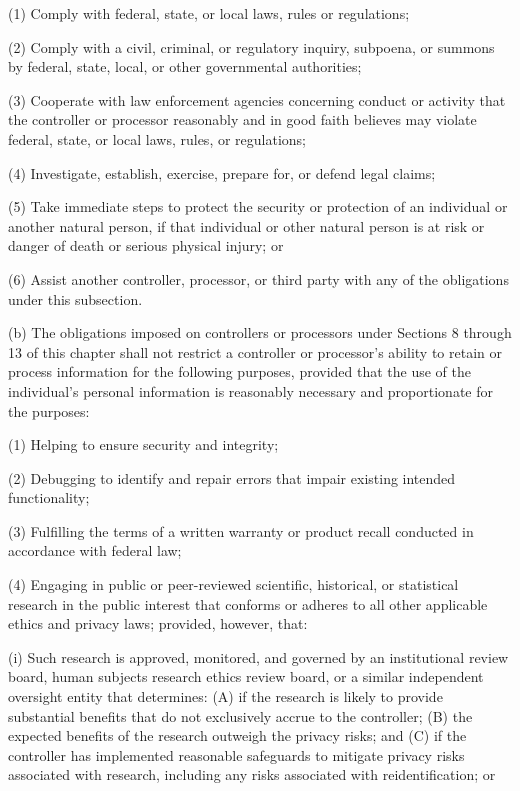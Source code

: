(1) Comply with federal, state, or local laws, rules or regulations;

(2) Comply with a civil, criminal, or regulatory inquiry, subpoena, or summons by federal, state, local, or other governmental authorities;

(3) Cooperate with law enforcement agencies concerning conduct or activity that the controller or processor reasonably and in good faith believes may violate federal, state, or local laws, rules, or regulations;

(4) Investigate, establish, exercise, prepare for, or defend legal claims;

(5) Take immediate steps to protect the security or protection of an individual or another natural person, if that individual or other natural person is at risk or danger of death or serious physical injury; or

(6) Assist another controller, processor, or third party with any of the obligations under this subsection.

(b) The obligations imposed on controllers or processors under Sections 8 through 13 of this chapter shall not restrict a controller or processor’s ability to retain or process information for the following purposes, provided that the use of the individual’s personal information is reasonably necessary and proportionate for the purposes: 

(1) Helping to ensure security and integrity;

(2) Debugging to identify and repair errors that impair existing intended functionality;

(3) Fulfilling the terms of a written warranty or product recall conducted in accordance with federal law;

(4) Engaging in public or peer-reviewed scientific, historical, or statistical research in the public interest that conforms or adheres to all other applicable ethics and privacy laws; provided, however, that:

(i) Such research is approved, monitored, and governed by an institutional review board, human subjects research ethics review board, or a similar independent oversight entity that determines: (A) if the research is likely to provide substantial benefits that do not exclusively accrue to the controller; (B) the expected benefits of the research outweigh the privacy risks; and (C) if the controller has implemented reasonable safeguards to mitigate privacy risks associated with research, including any risks associated with reidentification; or

